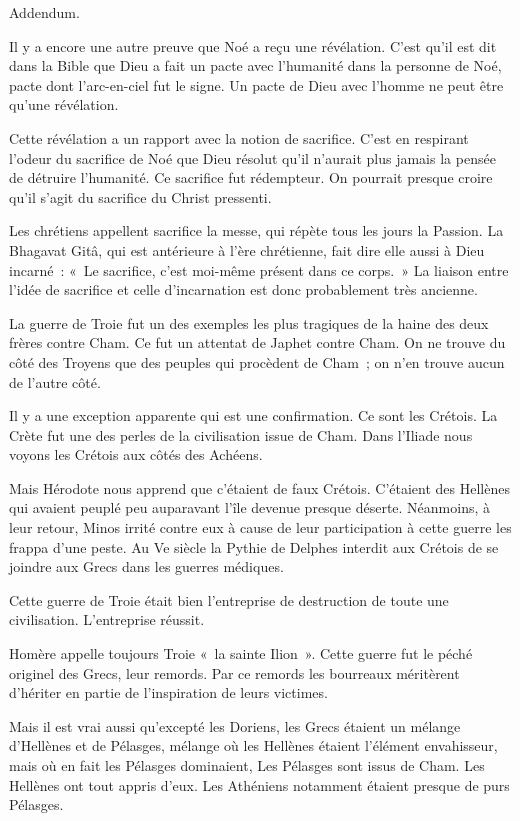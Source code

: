 \documentclass[french,twoside]{book} %
\begin{document}
\begin{center}
Addendum.\end{center}
\noindent Il y a encore une autre preuve que Noé a reçu une révélation. C'est qu'il est dit dans la Bible que Dieu a fait un pacte avec l'humanité dans la personne de Noé, pacte dont l'arc-en-ciel fut le signe. Un pacte de Dieu avec l'homme ne peut être qu'une révélation.\par
Cette révélation a un rapport avec la notion de sacrifice. C'est en respirant l'odeur du sacrifice de Noé que Dieu résolut qu'il n'aurait plus jamais la pensée de détruire l'humanité. Ce sacrifice fut rédempteur. On pourrait presque croire qu'il s'agit du sacrifice du Christ pressenti.\par
Les chrétiens appellent sacrifice la messe, qui répète tous les jours la Passion. La Bhagavat Gitâ, qui est antérieure à l'ère chrétienne, fait dire elle aussi à Dieu incarné : « Le sacrifice, c'est moi-même présent dans ce corps. » La liaison entre l'idée de sacrifice et celle d'incarnation est donc probablement très ancienne.\par
La guerre de Troie fut un des exemples les plus tragiques de la haine des deux frères contre Cham. Ce fut un attentat de Japhet contre Cham. On ne trouve du côté des Troyens que des peuples qui procèdent de Cham ; on n'en trouve aucun de l'autre côté.\par
Il y a une exception apparente qui est une confirmation. Ce sont les Crétois. La Crète fut une des perles de la civilisation issue de Cham. Dans l'Iliade nous voyons les Crétois aux côtés des Achéens.\par
Mais Hérodote nous apprend que c'étaient de faux Crétois. C'étaient des Hellènes qui avaient peuplé peu auparavant l'île devenue presque déserte. Néanmoins, à leur retour, Minos irrité contre eux à cause de leur participation à cette guerre les frappa d'une peste. Au Ve siècle la Pythie de Delphes interdit aux Crétois de se joindre aux Grecs dans les guerres médiques.\par
Cette guerre de Troie était bien l'entreprise de destruction de toute une civilisation. L'entreprise réussit.\par
Homère appelle toujours Troie « la sainte Ilion ». Cette guerre fut le péché originel des Grecs, leur remords. Par ce remords les bourreaux méritèrent d'hériter en partie de l'inspiration de leurs victimes.\par
Mais il est vrai aussi qu'excepté les Doriens, les Grecs étaient un mélange d'Hellènes et de Pélasges, mélange où les Hellènes étaient l'élément envahisseur, mais où en fait les Pélasges dominaient, Les Pélasges sont issus de Cham. Les Hellènes ont tout appris d'eux. Les Athéniens notamment étaient presque de purs Pélasges.\par
\end{document}
